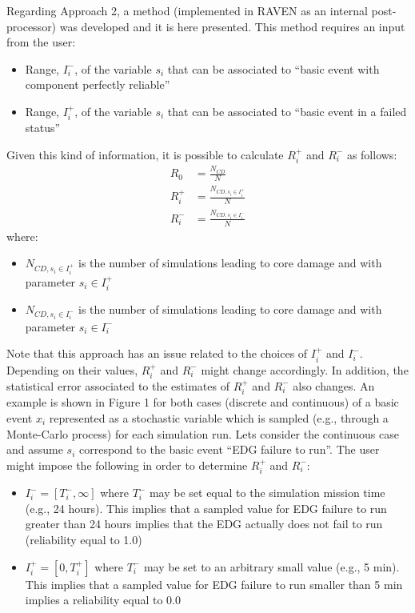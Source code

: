 Regarding Approach 2, a method (implemented in RAVEN as an internal post-processor) was developed and it is 
here presented. This method requires an input from the user:
\begin{itemize}
  \item Range, $I_i^-$, of the variable $s_i$ that can be associated to ``basic event with component perfectly reliable''
  \item Range, $I_i^+$, of the variable $s_i$ that can be associated to ``basic event in a failed status''
\end{itemize}
Given this kind of information, it is possible to calculate $R_i^+$ and $R_i^-$ as follows:
\begin{align} 
  R_0   &= \frac{N_{CD}}{N}  \\
  R_i^+ &= \frac{N_{CD, s_i \in I_i^+}}{N}   \\
  R_i^- &= \frac{N_{CD, s_i \in I_i^-}}{N} 
\end{align}
where:
\begin{itemize}
  \item $N_{CD, s_i \in I_i^+}$ is the number of simulations leading to core damage and with parameter $s_i \in I_i^+$
  \item $N_{CD, s_i \in I_i^-}$ is the number of simulations leading to core damage and with parameter $s_i \in I_i^-$
\end{itemize}

Note that this approach has an issue related to the choices of $I_i^+$ and $I_i^-$. 
Depending on their values, $R_i^+$ and $R_i^-$ might change accordingly. In addition, the statistical error 
associated to the estimates of $R_i^+$ and $R_i^-$ also changes. 
An example is shown in Figure 1 for both cases (discrete and continuous) of a basic event $x_i$ represented 
as a stochastic variable which is sampled (e.g., through a Monte-Carlo process) for each simulation run.
Lets consider the continuous case and assume $s_i$ correspond to the basic event ``EDG failure to run''. 
The user might impose the following in order to determine $R_i^+$ and $R_i^-$:
\begin{itemize}
  \item $I_i^-=[T_i^-,\infty]$ where $T_i^-$ may be set equal to the simulation mission time (e.g., 24 hours). 
        This implies that a sampled value for EDG failure to run greater than 24 hours implies that the 
        EDG actually does not fail to run (reliability equal to 1.0)
  \item $I_i^+=[0,T_i^+ ]$ where $T_i^-$ may be set to an arbitrary small value (e.g., 5 min). This implies that 
        a sampled value for EDG failure to run smaller than 5 min implies a reliability equal to 0.0
\end{itemize}

